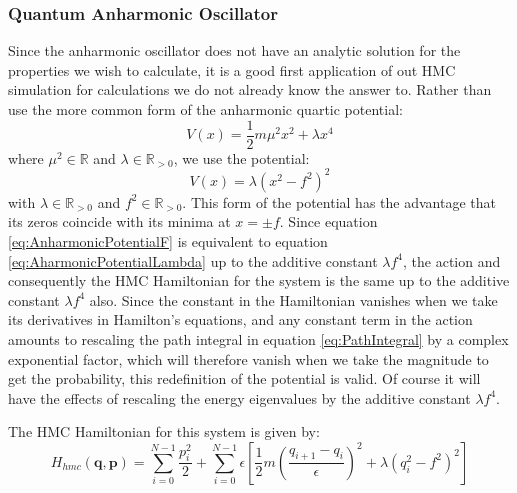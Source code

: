 \documentclass[12pt]{article}
\begin{document}
        \subsubsection{Quantum Anharmonic Oscillator}
            Since the anharmonic oscillator does not have an analytic solution for the properties we wish to calculate, it is a good first application of out HMC simulation for calculations we do not already know the answer to. Rather than use the more common form of the anharmonic quartic potential:
            \begin{equation}
                \label{eq:AharmonicPotentialLambda}
                V\left(x\right) = \frac{1}{2}m\mu^2x^2+\lambda x^4
            \end{equation}
            where $\mu^2 \in\mathbb{R}$ and $\lambda\in\mathbb{R}_{>0}$, we use the potential:
            \begin{equation}
                \label{eq:AnharmonicPotentialF}
                V\left(x\right) = \lambda\left(x^2-f^2\right)^2
            \end{equation}
            with $\lambda\in\mathbb{R}_{>0}$ and $f^2\in\mathbb{R}_{>0}$. This form of the potential has the advantage that its zeros coincide with its minima at $x=\pm f$. Since equation \ref{eq:AnharmonicPotentialF} is equivalent to equation \ref{eq:AharmonicPotentialLambda} up to the additive constant $\lambda f^4$, the action and consequently the HMC Hamiltonian for the system is the same up to the additive constant $\lambda f^4$ also. Since the constant in the Hamiltonian vanishes when we take its derivatives in Hamilton's equations, and any constant term in the action amounts to rescaling the path integral in equation \ref{eq:PathIntegral} by a complex exponential factor, which will therefore vanish when we take the magnitude to get the probability, this redefinition of the potential is valid. Of course it will have the effects of rescaling the energy eigenvalues by the additive constant $\lambda f^4$. 

            The HMC Hamiltonian for this system is given by:
            \begin{equation}
                \label{eq:AnharmonicHMCHamiltonian}
                H_{hmc}\left(\bm{q},\bm{p}\right) = \sum_{i=0}^{N-1} \frac{p_i^2}{2} + \sum_{i=0}^{N-1} \epsilon \left[\frac{1}{2}m\left(\frac{q_{i+1}-q_{i}}{\epsilon}\right)^2 + \lambda\left(q_i^2-f^2\right)^2\right]
            \end{equation}
\end{document}
